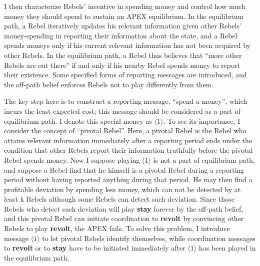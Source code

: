 \documentclass[12pt,letterpaper]{article}
\newtheorem*{main result}{Main Result}
\theoremstyle{definition}
\theoremstyle{remark}
\theoremstyle{claim}
\begin{document}
I then characterize Rebels' incentive in spending money and control how much money they should spend to sustain an APEX equilibrium. In the equilibrium path, a Rebel iteratively updates his relevant information given other Rebels' money-spending in reporting their information about the state, and a Rebel spends moneys only if his current relevant information has not been acquired by other Rebels. In the equilibrium path, a Rebel thus believes that ``more other Rebels are out there'' if and only if his nearby Rebel spends money to report their existence. Some specified forms of reporting messages are introduced, and the off-path belief enforces Rebels not to play differently from them.

The key step here is to construct a reporting message, ``spend a money'', which incurs the least expected cost; this message should be considered as a part of equilibrium path. I denote this special money as $\langle 1 \rangle$. To see its importance, I consider the concept of ``pivotal Rebel''. Here, a pivotal Rebel is the Rebel who attains relevant information immediately after a reporting period ends under the condition that other Rebels report their information truthfully before the pivotal Rebel spends money. Now I suppose playing $\langle 1 \rangle$ is not a part of equilibrium path, and suppose a Rebel find that he himself is a pivotal Rebel during a reporting period without having reported anything during that period. He may then find a profitable deviation by spending less money, which can not be detected by at least k Rebels although some Rebels can detect such deviation. Since those Rebels who detect such deviation will play \textbf{stay} forever by the off-path belief, and this pivotal Rebel can initiate coordination to \textbf{revolt} by convincing other Rebels to play \textbf{revolt}, the APEX fails. To solve this problem, I introduce message $\langle 1 \rangle$ to let pivotal Rebels identify themselves, while coordination messages to \textbf{revolt} or to \textbf{stay} have to be initiated immediately after $\langle 1 \rangle$ has been played in the equilibrium path.
\end{document}
